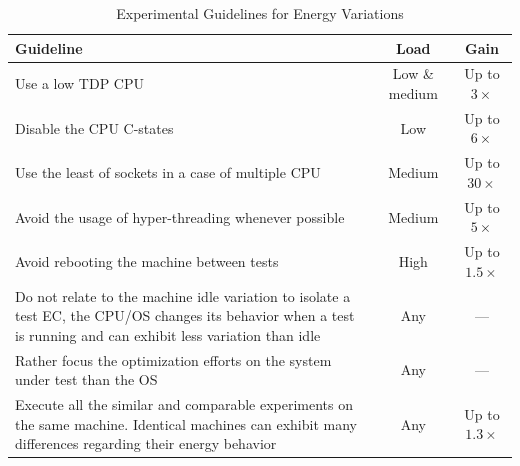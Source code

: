 \begin{table}[h!]
    \centering
    \caption{Experimental Guidelines for Energy Variations}
    \small
    \begin{tabular}{|p{4.7cm}|c|c|}
        \hline
        \textbf{Guideline}                                                                                                                                                & \textbf{Load} & \textbf{Gain}     \\
        \hline
        \hline
        Use a low TDP CPU                                                                                                                                                 & Low \& medium & Up to $3\times$   \\
        \hline
        Disable the CPU C-states                                                                                                                                          & Low           & Up to $6\times$   \\
        \hline
        Use the least of sockets in a case of multiple CPU                                                                                                                & Medium        & Up to $30\times$  \\
        \hline
        Avoid the usage of hyper-threading whenever possible                                                                                                              & Medium        & Up to $5\times$   \\
        \hline
        Avoid rebooting the machine between tests                                                                                                                         & High          & Up to $1.5\times$ \\
        \hline
        Do not relate to the machine idle variation to isolate a test EC, the CPU/OS changes its behavior when a test is running and can exhibit less variation than idle & Any           & ---               \\
        \hline
        Rather focus the optimization efforts on the system under test than the OS                                                                                        & Any           & ---               \\
        \hline
        Execute all the similar and comparable experiments on the same machine. Identical machines can exhibit many differences regarding their energy behavior             & Any           & Up to $1.3\times$ \\
        \hline
    \end{tabular}
    \label{table:guidelines}
\end{table}

